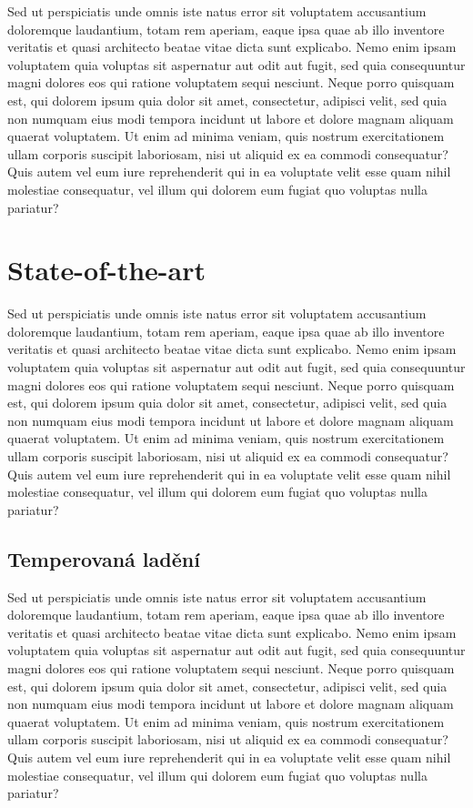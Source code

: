 \documentclass[thesis=M,english,hidelinks]{FITthesis}[2012/10/20]
\begin{document}
Sed ut perspiciatis unde omnis iste natus error sit voluptatem accusantium doloremque laudantium, totam rem aperiam, eaque ipsa quae ab illo inventore veritatis et quasi architecto beatae vitae dicta sunt explicabo. Nemo enim ipsam voluptatem quia voluptas sit aspernatur aut odit aut fugit, sed quia consequuntur magni dolores eos qui ratione voluptatem sequi nesciunt. Neque porro quisquam est, qui dolorem ipsum quia dolor sit amet, consectetur, adipisci velit, sed quia non numquam eius modi tempora incidunt ut labore et dolore magnam aliquam quaerat voluptatem. Ut enim ad minima veniam, quis nostrum exercitationem ullam corporis suscipit laboriosam, nisi ut aliquid ex ea commodi consequatur? Quis autem vel eum iure \cite{rybicka} reprehenderit qui in ea voluptate velit esse quam nihil molestiae consequatur, vel illum qui dolorem eum fugiat quo voluptas nulla pariatur?

\chapter{State-of-the-art}

Sed ut perspiciatis unde omnis iste natus error sit voluptatem accusantium doloremque laudantium, totam rem aperiam, eaque ipsa quae ab illo inventore veritatis et quasi architecto beatae vitae dicta sunt explicabo. Nemo enim ipsam voluptatem quia voluptas sit aspernatur aut odit aut fugit, sed quia consequuntur magni dolores eos qui ratione voluptatem sequi nesciunt. Neque porro quisquam est, qui dolorem ipsum quia dolor sit amet, consectetur, adipisci velit, sed quia non numquam eius modi tempora incidunt ut labore et dolore magnam aliquam quaerat voluptatem. Ut enim ad minima veniam, quis nostrum exercitationem ullam corporis suscipit laboriosam, nisi ut aliquid ex ea commodi consequatur? Quis autem vel eum iure \cite{rybicka} reprehenderit qui in ea voluptate velit esse quam nihil molestiae consequatur, vel illum qui dolorem eum fugiat quo voluptas nulla pariatur?

\section{Temperovaná ladění}

Sed ut perspiciatis unde omnis iste natus error sit voluptatem accusantium doloremque laudantium, totam rem aperiam, eaque ipsa quae ab illo inventore veritatis et quasi architecto beatae vitae dicta sunt explicabo. Nemo enim ipsam voluptatem quia voluptas sit aspernatur aut odit aut fugit, sed quia consequuntur magni dolores eos qui ratione voluptatem sequi nesciunt. Neque porro quisquam est, qui dolorem ipsum quia dolor sit amet, consectetur, adipisci velit, sed quia non numquam eius modi tempora incidunt ut labore et dolore magnam aliquam quaerat voluptatem. Ut enim ad minima veniam, quis nostrum exercitationem ullam corporis suscipit laboriosam, nisi ut aliquid ex ea commodi consequatur? Quis autem vel eum iure \cite{rybicka} reprehenderit qui in ea voluptate velit esse quam nihil molestiae consequatur, vel illum qui dolorem eum fugiat quo voluptas nulla pariatur?
\end{document}
